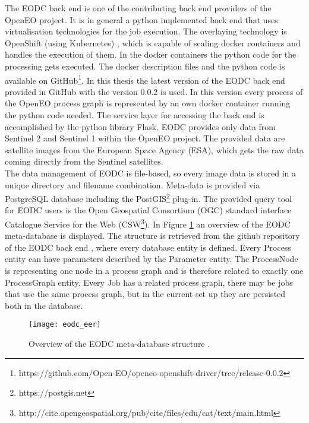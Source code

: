\documentclass[draft,final]{vutinfth} %
\begin{document}
The EODC back end is one of the contributing back end providers of the OpenEO project. It is in general a python implemented back end that uses virtualisation technologies for the job execution. The overlaying technology is OpenShift (using Kubernetes) \cite{openshift}, which is capable of scaling docker containers and handles the execution of them. In the docker containers the python code for the processing gets executed. The docker description files and the python code is available on GitHub\footnote{https://github.com/Open-EO/openeo-openshift-driver/tree/release-0.0.2}. In this thesis the latest version of the EODC back end provided in GitHub with the version 0.0.2 is used. In this version every process of the OpenEO process graph is represented by an own docker container running the python code needed. The service layer for accessing the back end is accomplished by the python library Flask. EODC provides only data from Sentinel 2 and Sentinel 1 within the OpenEO project. The provided data are satellite images from the European Space Agency (ESA), which gets the raw data coming directly from the Sentinel satellites. \\
The data management of EODC is file-based, so every image data is stored in a unique directory and filename combination. Meta-data is provided via PostgreSQL database including the PostGIS\footnote{https://postgis.net} plug-in. The provided query tool for EODC users is the Open Geospatial Consortium (OGC) standard interface Catalogue Service for the Web (CSW\footnote{http://cite.opengeospatial.org/pub/cite/files/edu/cat/text/main.html}). In Figure \ref{fig:eodceer} an overview of the EODC meta-database is displayed. The structure is retrieved from the github repository of the EODC back end \cite{eodc_github}, where every database entity is defined. Every Process entity can have parameters described by the Parameter entity. The ProcessNode is representing one node in a process graph and is therefore related to exactly one ProcessGraph entity. Every Job has a related process graph, there may be jobs that use the same process graph, but in the current set up they are persisted both in the database.

\begin{figure}[h]
	\centering
	\texttt{[image: eodc\_eer]}
	\caption{Overview of the EODC meta-database structure \cite{eodc_github}.}
	\label{fig:eodceer} %
\end{figure}
\end{document}
